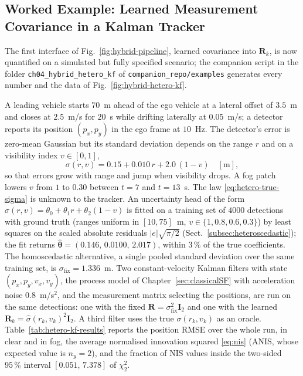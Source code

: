 \documentclass[graybox,envcountchap]{style/SNmono}
\newcommand{\repopath}[1]{\texttt{#1}}
\begin{document}
\subsection{Worked Example: Learned Measurement Covariance in a Kalman Tracker}
\label{subsec:hybrid-worked-example}
The first interface of Fig.~\ref{fig:hybrid-pipeline}, learned covariance into $\mathbf{R}_k$, is now quantified on a simulated but fully specified scenario; the companion script in the folder \repopath{ch04\_\allowbreak hybrid\_\allowbreak hetero\_\allowbreak kf} of \repopath{companion\_\allowbreak repo/\allowbreak examples} generates every number and the data of Fig.~\ref{fig:hybrid-hetero-kf}.
\begin{example}
\label{ex:hybrid-hetero-kf}
A leading vehicle starts $70$~m ahead of the ego vehicle at a lateral offset of $3.5$~m and closes at $2.5$~m/s for $20$~s while drifting laterally at $0.05$~m/s; a detector reports its position $(p_x,p_y)$ in the ego frame at $10$~Hz. The detector's error is zero-mean Gaussian but its standard deviation depends on the range $r$ and on a visibility index $v\in[0,1]$,
\begin{equation}
\sigma(r,v)=0.15+0.010\,r+2.0\,(1-v)\quad[\mathrm{m}],
\label{eq:hetero-true-sigma}
\end{equation}
so that errors grow with range and jump when visibility drops. A fog patch lowers $v$ from $1$ to $0.30$ between $t=7$ and $t=13$~s. The law \eqref{eq:hetero-true-sigma} is unknown to the tracker. An uncertainty head of the form $\widehat{\sigma}(r,v)=\theta_0+\theta_1 r+\theta_2(1-v)$ is fitted on a training set of $4000$ detections with ground truth (ranges uniform in $[10,75]$~m, $v\in\{1,0.8,0.6,0.3\}$) by least squares on the scaled absolute residuals $|e|\sqrt{\pi/2}$ (Sect.~\ref{subsec:heteroscedastic}); the fit returns $\widehat{\boldsymbol{\theta}}=(0.146,\,0.0100,\,2.017)$, within $3\,\%$ of the true coefficients. The homoscedastic alternative, a single pooled standard deviation over the same training set, is $\sigma_{\mathrm{fix}}=1.336$~m. Two constant-velocity Kalman filters with state $(p_x,p_y,v_x,v_y)$, the process model of Chapter~\ref{sec:classicalSF} with acceleration noise $0.8$~m/s$^{2}$, and the measurement matrix selecting the positions, are run on the same detections: one with the fixed $\mathbf{R}=\sigma_{\mathrm{fix}}^{2}\mathbf{I}_2$ and one with the learned $\mathbf{R}_k=\widehat{\sigma}(r_k,v_k)^{2}\mathbf{I}_2$. A third filter uses the true $\sigma(r_k,v_k)$ as an oracle. Table~\ref{tab:hetero-kf-results} reports the position RMSE over the whole run, in clear and in fog, the average normalised innovation squared \eqref{eq:nis} (ANIS, whose expected value is $n_y=2$), and the fraction of NIS values inside the two-sided $95\,\%$ interval $[0.051,\,7.378]$ of $\chi^{2}_{2}$.

\end{example}
\end{document}
